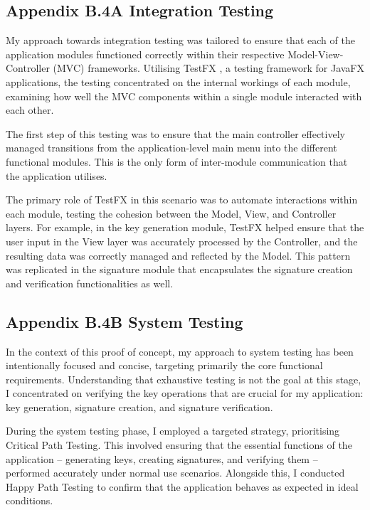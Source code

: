 \documentclass[]{final_report}
\theoremstyle{definition}
\begin{document}
\subsection{Appendix B.4A Integration Testing}
My approach towards integration testing was tailored to ensure that each of the application modules functioned correctly within their respective Model-View-Controller (MVC) frameworks. Utilising TestFX \cite{TestFX2023}, a testing framework for JavaFX applications, the testing concentrated on the internal workings of each module, examining how well the MVC components within a single module interacted with each other.

The first step of this testing was to ensure that the main controller effectively managed transitions from the application-level main menu into the different functional modules. This is the only form of inter-module communication that the application utilises.

The primary role of TestFX in this scenario was to automate interactions within each module, testing the cohesion between the Model, View, and Controller layers. For example, in the key generation module, TestFX helped ensure that the user input in the View layer was accurately processed by the Controller, and the resulting data was correctly managed and reflected by the Model. This pattern was replicated in the signature module that encapsulates the signature creation and verification functionalities as well.



\subsection{Appendix B.4B System Testing}
In the context of this proof of concept, my approach to system testing has been intentionally focused and concise, targeting primarily the core functional requirements. Understanding that exhaustive testing is not the goal at this stage, I concentrated on verifying the key operations that are crucial for my application: key generation, signature creation, and signature verification.

During the system testing phase, I employed a targeted strategy, prioritising Critical Path Testing. This involved ensuring that the essential functions of the application – generating keys, creating signatures, and verifying them – performed accurately under normal use scenarios. Alongside this, I conducted Happy Path Testing to confirm that the application behaves as expected in ideal conditions.
\end{document}
